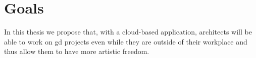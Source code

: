\section{Goals}
In this thesis we propose that, with a cloud-based application, architects will be able to work on \gls{gd} projects even while they are outside of their workplace and thus allow them to have more artistic freedom.













%

